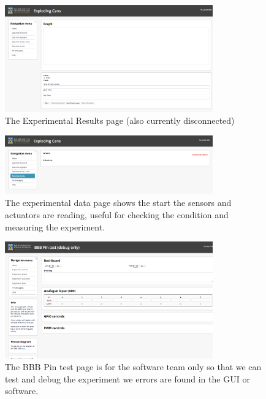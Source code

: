 \begin{figure}[H]
	\centering
	\includegraphics[width=0.8\textwidth]{figures/gui_results.png}
	\caption{The Experimental Results page (also currently disconnected)} 
\end{figure}

\begin{figure}[H]
	\centering
	\includegraphics[width=0.8\textwidth]{figures/gui_data.png}
	\caption{The experimental data page shows the start the sensors and actuators are reading, useful for checking the condition and measuring the experiment. } 
\end{figure}

\begin{figure}[H]
	\centering
	\includegraphics[width=0.8\textwidth]{figures/gui_pintest.png}
	\caption{The BBB Pin test page is for the software team only so that we can test and debug the experiment we errors are found in the GUI or software. } 
\end{figure}

